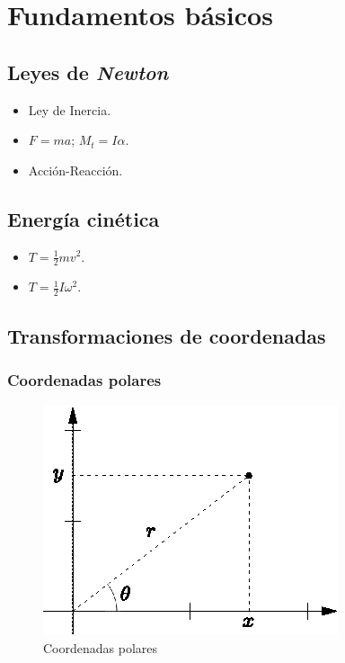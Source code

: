 \chapter{Fundamentos básicos}

\section{Leyes de \emph{Newton}}

\begin{itemize}
    \item Ley de Inercia.
    \item $F=ma$; $M_t=I\alpha$.
    \item Acción-Reacción.
\end{itemize}

\section{Energía cinética}

\begin{itemize}
    \item $T=\frac{1}{2}mv^2$.
    \item $T=\frac{1}{2}I\omega^2$.
\end{itemize}

\section{Transformaciones de coordenadas}

\subsection{Coordenadas polares}

\begin{figure}[H]
    \centering
    \includegraphics[scale=1.5]{resources/figura_01.eps}
    \caption{Coordenadas polares}\label{figura_01}
\end{figure}


